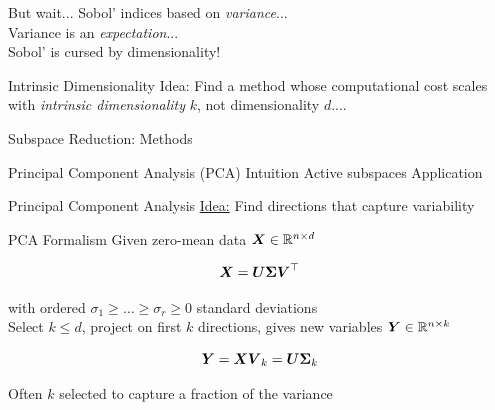 \documentclass[14pt]{beamer}
\begin{document}
\begin{frame}{But wait...}
  Sobol' indices based on \emph{variance}... \\
  Variance is an \emph{expectation}... \\

  \bigskip Sobol' is cursed by dimensionality! \\
\end{frame}

\begin{frame}{Intrinsic Dimensionality}
  Idea: Find a method whose computational cost scales with \emph{intrinsic
    dimensionality} $k$, \alert{not} dimensionality $d$....
\end{frame}

\begin{frame}{Subspace Reduction: Methods}
  \begin{outline}
    \1 Principal Component Analysis (PCA)
      \2 Intuition
    \1 Active subspaces
      \2 Application
  \end{outline}
\end{frame}

\begin{frame}{Principal Component Analysis}
  \huge\underline{Idea:} Find directions that capture variability
\end{frame}


\begin{frame}{PCA Formalism}
  Given zero-mean data $\boldsymbol{X}\in\mathbb{R}^{n\times d}$

  \begin{equation*}
    \boldsymbol{X} = \boldsymbol{U}\boldsymbol{\Sigma}\boldsymbol{V}^{\top}
  \end{equation*}

  \noindent with ordered $\sigma_1\geq\dots\geq\sigma_r\geq0$ standard
  deviations \\

  Select $k \leq d$, project on first $k$ directions, gives new variables
  $\boldsymbol{Y}\in\mathbb{R}^{n\times k}$

  \begin{equation*}
    \boldsymbol{Y} = \boldsymbol{X}\boldsymbol{V}_k = \boldsymbol{U}\boldsymbol{\Sigma}_k
  \end{equation*}

  Often $k$ selected to capture a fraction of the variance
\end{frame}
\end{document}
